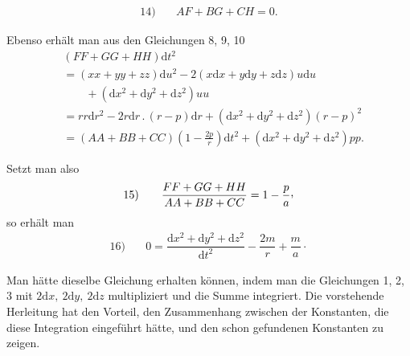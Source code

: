 \[
\begin{array}{rl}14)\quad&AF+BG+CH=0.\end{array}
\]
\par Ebenso erhält man aus den Gleichungen 8, 9, 10
\[
\begin{aligned}
&(FF+GG+HH)\mathrm{d}t^2\\
&=(xx+yy+zz)\mathrm{d}u^2-2(x\mathrm{d}x+y\mathrm{d}y+z\mathrm{d}z)u\mathrm{d}u\\
&\qquad{}+(\mathrm{d}x^2+\mathrm{d}y^2+\mathrm{d}z^2)uu\\
&=rr\mathrm{d}r^2-2r\mathrm{d}r\mathpunct{.}(r-p)\mathrm{d}r+(\mathrm{d}x^2+\mathrm{d}y^2+\mathrm{d}z^2)(r-p)^2\\
&=(AA+BB+CC)\left(1-\frac{2p}{r}\right)\mathrm{d}t^2+(\mathrm{d}x^2+\mathrm{d}y^2+\mathrm{d}z^2)pp.
\end{aligned}
\]
\par Setzt man also
\[
\begin{array}{rl}15)\quad&\dfrac{FF+GG+HH}{AA+BB+CC}=1-\dfrac{p}{a}\mathpunct{\raisebox{.45ex}{,}}\end{array}
\]
so erhält man
\[
\begin{array}{rl}16)\quad&0=\dfrac{\mathrm{d}x^2+\mathrm{d}y^2+\mathrm{d}z^2}{\mathrm{d}t^2}-\dfrac{2m}{r}+\dfrac{m}{a}\mathpunct{\cdot}\end{array}
\]
\par Man hätte dieselbe Gleichung erhalten können, indem man die Gleichungen 1, 2, 3 mit \(2\mathrm{d}x,\ 2\mathrm{d}y,\ 2\mathrm{d}z\) multipliziert und die Summe integriert. Die vorstehende Herleitung hat den Vorteil, den Zusammenhang zwischen der Konstanten, die diese Integration eingeführt hätte, und den schon gefundenen Konstanten zu zeigen.
\par
